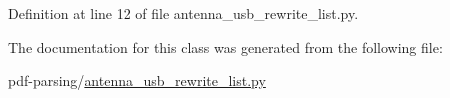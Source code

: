 Definition at line 12 of file antenna\+\_\+usb\+\_\+rewrite\+\_\+list.\+py.



The documentation for this class was generated from the following file\+:\begin{DoxyCompactItemize}
\item 
pdf-\/parsing/\hyperlink{antenna__usb__rewrite__list_8py}{antenna\+\_\+usb\+\_\+rewrite\+\_\+list.\+py}\end{DoxyCompactItemize}
